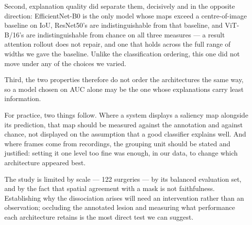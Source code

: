 \documentclass[preprint,12pt]{elsarticle}
\begin{document}
Second, explanation quality did separate them, decisively and in the opposite direction: EfficientNet-B0 is the only model whose maps exceed a centre-of-image baseline on IoU, ResNet50's are indistinguishable from that baseline, and ViT-B/16's are indistinguishable from chance on all three measures --- a result attention rollout does not repair, and one that holds across the full range of widths we gave the baseline. Unlike the classification ordering, this one did not move under any of the choices we varied.

Third, the two properties therefore do not order the architectures the same way, so a model chosen on AUC alone may be the one whose explanations carry least information.

For practice, two things follow. Where a system displays a saliency map alongside its prediction, that map should be measured against the annotation and against chance, not displayed on the assumption that a good classifier explains well. And where frames come from recordings, the grouping unit should be stated and justified: setting it one level too fine was enough, in our data, to change which architecture appeared best.

The study is limited by scale --- 122 surgeries --- by its balanced evaluation set, and by the fact that spatial agreement with a mask is not faithfulness. Establishing why the dissociation arises will need an intervention rather than an observation; occluding the annotated lesion and measuring what performance each architecture retains is the most direct test we can suggest.



\end{document}

